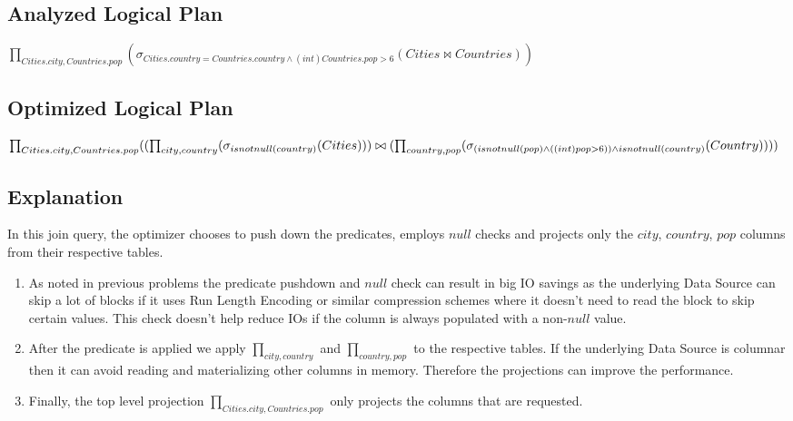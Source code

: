 \documentclass[12pt]{article}
\begin{document}
\subsection*{Analyzed Logical Plan}

$\prod_{Cities.city, Countries.pop}(\sigma_{Cities.country = Countries.country \wedge (int) Countries.pop > 6}(Cities \bowtie Countries))$

\subsection*{Optimized Logical Plan}

$\prod_{Cities.city, Countries.pop}((\prod_{city, country}(\sigma_{isnotnull(country)}(Cities))) \bowtie \\
 (\prod_{country, pop}(\sigma_{(isnotnull(pop) \wedge ((int) pop > 6)) \wedge isnotnull(country)}(Country))))$


\subsection*{Explanation}

In this join query, the optimizer chooses to push down the predicates, employs $null$ checks and projects only the $city$, $country$, $pop$ columns from their respective tables.

\begin{enumerate}

\item As noted in previous problems the predicate pushdown and $null$ check can result in big IO savings as the underlying Data Source can skip a lot of blocks if it uses Run Length Encoding or similar compression schemes where it doesn't need to read the block to skip certain values. This check doesn't help reduce IOs if the column is always populated with a non-$null$ value.

\item After the predicate is applied we apply $\prod_{city, country}$ and $\prod_{country, pop}$ to the respective tables. If the underlying Data Source is columnar then it can avoid reading and materializing other columns in memory. Therefore the projections can improve the performance.

\item Finally, the top level projection $\prod_{Cities.city, Countries.pop}$ only projects the columns that are requested.

\end{enumerate}
\end{document}
